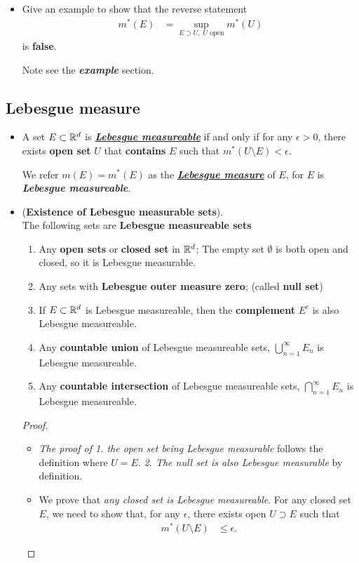 \documentclass[11pt]{article}
\begin{document}
\begin{itemize}
\item \begin{exercise} 
Give an example to show that the reverse statement
\begin{align*}
m^{*}(E) &= \sup\limits_{E\supset U, \;U\text{ open}}m^{*}(U)
\end{align*} is \textbf{false}.
 \end{exercise} Note see the \emph{\textbf{example}} section.
\end{itemize}
\subsection{Lebesgue measure}
\begin{itemize}
\item \begin{definition}
A set $E\subset {\mathbb R}^{d}$ is \underline{\emph{\textbf{Lebesgue measureable}}} if and only if for any $\epsilon>0$, there exists \textbf{open set} $U$ that \textbf{contains} $E$ such that  $m^{*}(U \setminus  E)< \epsilon$. 
\end{definition}
We refer $m(E)= m^{*}(E)$ as the \underline{\emph{\textbf{Lebesgue measure}}} of $E$, for $E$ is \emph{\textbf{Lebesgue measureable}}. 

\item \begin{lemma} (\textbf{Existence of Lebesgue measurable sets}).\\
The following sets are \textbf{Lebesgue measureable sets}
\begin{enumerate}
\item Any \textbf{open sets} or \textbf{closed set} in ${\mathbb R}^{d}$; The empty set $\emptyset$ is both open and closed, so it is Lebesgue measurable.
\item Any sets with \textbf{Lebesgue outer measure zero}; (called \textbf{null set})
\item If $E\subset {\mathbb R}^{d}$ is Lebesgue measureable, then the \textbf{complement} $E^{c}$ is also Lebesgue measureable.
\item Any \textbf{countable union} of Lebesgue measureable sets, $\bigcup_{n=1}^{\infty}E_{n}$ is Lebesgue measureable.
\item  Any \textbf{countable intersection} of Lebesgue measureable sets, $\bigcap_{n=1}^{\infty}E_{n}$ is Lebesgue measureable.
\end{enumerate}
\end{lemma}
\begin{proof}
\begin{itemize}
\item \emph{The proof of 1. the open set being Lebesgue measurable} follows the definition where $U =E$. \emph{2. The null set is also Lebesgue measurable} by definition.   
\item We prove that \emph{any closed set is Lebesgue measureable}. 
For any closed set $E$, we need to show that, for any $\epsilon$, there exists open $U\supset E$ such that 
\begin{align*}
m^{*}(U \setminus  E) &\le \epsilon. 
\end{align*}


\end{itemize}
\end{proof}
\end{itemize}
\end{document}
